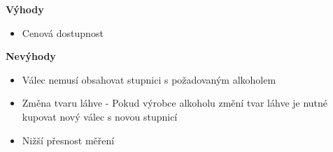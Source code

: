 

\textbf{Výhody}
\begin{itemize}
    \item Cenová dostupnost\\
\end{itemize}

\textbf{Nevýhody}
\begin{itemize}
    \item Válec nemusí obsahovat stupnici s požadovaným alkoholem
    \item Změna tvaru láhve - Pokud výrobce alkoholu změní tvar láhve je nutné kupovat nový válec s novou stupnicí
    \item Nižší přesnost měření\\\\\\\\\\\\\\\\\\
\end{itemize}


